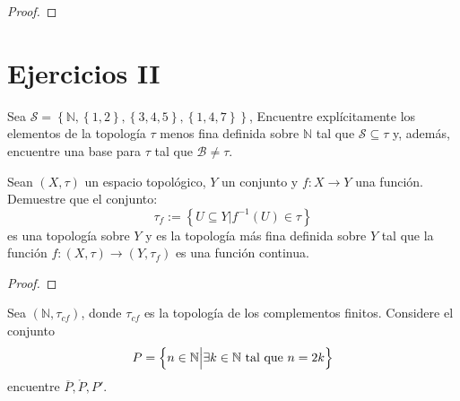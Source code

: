 \documentclass[12pt]{report}
\theoremstyle{largebreak}
\newcommand\cf[3]{\ensuremath{#1:#2\rightarrow#3}}
\newcommand{\Int}[1]{\ensuremath{\mathring{#1}}}
\newcommand{\Cls}[1]{\ensuremath{\overline{#1}}}
\begin{document}
    \begin{proof}
        
    \end{proof}

    \section{Ejercicios II}

    \begin{excer}
        Sea $\mathcal{S}=\left\{\mathbb{N},\left\{1,2 \right\},\left\{3,4,5 \right\},\left\{1,4,7 \right\} \right\}$, Encuentre explícitamente los elementos de la topología $\tau$ menos fina definida sobre $\mathbb{N}$ tal que $\mathcal{S}\subseteq\tau$ y, además, encuentre una base para $\tau$ tal que $\mathcal{B}\neq\tau$.
    \end{excer}

    \begin{sol}
        
    \end{sol}

    \begin{excer}
        Sean $(X,\tau)$ un espacio topológico, $Y$ un conjunto y $\cf{f}{X}{Y}$ una función. Demuestre que el conjunto:
        \begin{equation*}
            \tau_f:=\left\{U\subseteq Y\Big|f^{-1}(U)\in\tau \right\}
        \end{equation*}
        es una topología sobre $Y$ y es la topología más fina definida sobre $Y$ tal que la función $\cf{f}{(X,\tau)}{(Y,\tau_f)}$ es una función continua.
    \end{excer}

    \begin{proof}
        
    \end{proof}

    \begin{excer}
        Sea $(\mathbb{N},\tau_{cf})$, donde $\tau_{cf}$ es la topología de los complementos finitos. Considere el conjunto
        \begin{equation*}
            P=\left\{n\in\mathbb{N}\Big|\exists k\in\mathbb{N} \textup{ tal que }n=2k \right\}
        \end{equation*}
        encuentre $\Cls{P}, \Int{P},P'$.
    \end{excer}

    \begin{sol}
        
    \end{sol}
\end{document}
